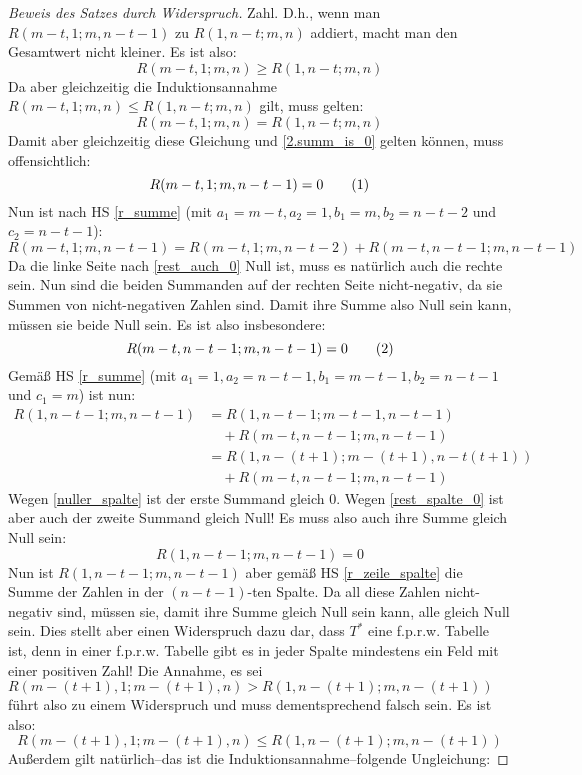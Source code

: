 \begin{proof}[Beweis des Satzes durch Widerspruch]
    Zahl. D.h., wenn man $R(m-t, 1; m, n-t-1)$ zu $R(1, n-t; m, n)$ addiert, macht man den Gesamtwert nicht kleiner. 
    Es ist also:
    \[
        R(m-t, 1; m, n)\geq R(1, n-t; m, n)
    \]
    Da aber gleichzeitig die Induktionsannahme $R(m-t, 1; m, n)\leq R(1, n-t; m, n)$ gilt, muss gelten:
    \[
        R(m-t, 1; m, n)=R(1, n-t; m, n)
    \]
    Damit aber gleichzeitig diese Gleichung und \eqref{2.summ_is_0} gelten können, muss offensichtlich:
    \[
        R(m-t, 1; m, n-t-1)=0 \numberthis \label{rest_auch_0}
    \]
    Nun ist nach HS \ref{r_summe} (mit $a_1=m-t, a_2=1, b_1=m, b_2=n-t-2$ und $c_2=n-t-1$):
    \[
        R(m-t, 1; m, n-t-1)=R(m-t, 1; m, n-t-2)+R(m-t, n-t-1; m, n-t-1)
    \]
    Da die linke Seite nach \eqref{rest_auch_0} Null ist, muss es natürlich auch die rechte sein. Nun sind die beiden 
    Summanden auf der rechten Seite nicht-negativ, da sie Summen von nicht-negativen Zahlen sind. Damit ihre Summe 
    also Null sein kann, müssen sie beide Null sein. Es ist also insbesondere:
    \[
        R(m-t, n-t-1; m, n-t-1)=0 \numberthis \label{rest_spalte_0}
    \]
    Gemäß HS \ref{r_summe} (mit $a_1=1, a_2=n-t-1, b_1=m-t-1, b_2=n-t-1$ und $c_1=m$) ist nun:
    \begin{align*}
        R(1, n-t-1; m, n-t-1)&=R(1, n-t-1; m-t-1, n-t-1)\\
        &\quad+R(m-t, n-t-1; m, n-t-1)\\
        &=R(1, n-(t+1); m-(t+1), n-t(t+1))\\
        &\quad+R(m-t, n-t-1; m, n-t-1)
    \end{align*}
    Wegen \eqref{nuller_spalte} ist der erste Summand gleich 0. Wegen \ref{rest_spalte_0} ist aber auch der zweite 
    Summand gleich Null! Es muss also auch ihre Summe gleich Null sein:
    \[
        R(1, n-t-1; m, n-t-1)=0
    \]
    Nun ist $R(1, n-t-1; m, n-t-1)$ aber gemäß HS \ref{r_zeile_spalte} die Summe der Zahlen in der $(n-t-1)$-ten Spalte. 
    Da all diese Zahlen nicht-negativ sind, müssen sie, damit ihre Summe gleich Null sein kann, alle gleich Null sein. 
    Dies stellt aber einen Widerspruch dazu dar, dass $T^*$ eine f.p.r.w. Tabelle ist, denn in einer f.p.r.w. Tabelle 
    gibt es in jeder Spalte mindestens ein Feld mit einer positiven Zahl! Die Annahme, es sei $R(m-(t+1), 1; m-(t+1), 
    n)>R(1, n-(t+1); m, n-(t+1))$ führt also zu einem Widerspruch und muss dementsprechend falsch sein. Es ist also:
    \[
        R(m-(t+1), 1; m-(t+1), n)\leq R(1, n-(t+1); m, n-(t+1))
    \]
    Außerdem gilt natürlich--das ist die Induktionsannahme--folgende Ungleichung:

\end{proof}
